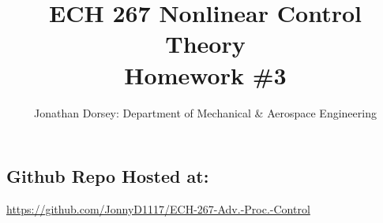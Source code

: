 \documentclass[12px]{article}
\begin{document}
    \title{ECH 267 Nonlinear Control Theory \\ Homework \#3  }

    \author{Jonathan Dorsey: Department of Mechanical \& Aerospace Engineering}


    \maketitle


    \begin{center}
        \section*{Github Repo Hosted at: }
        \url{https://github.com/JonnyD1117/ECH-267-Adv.-Proc.-Control}
    \end{center}












\end{document}
